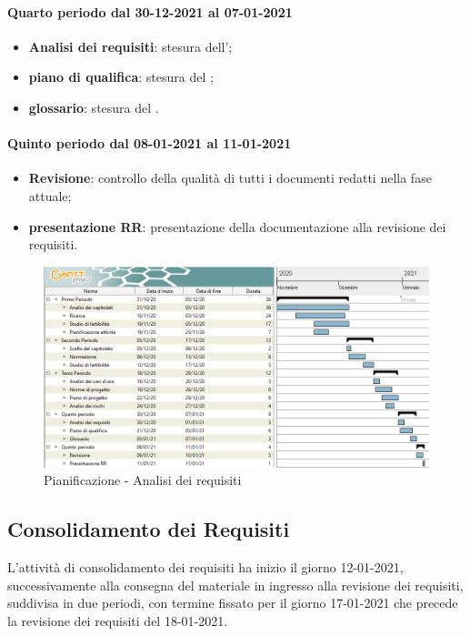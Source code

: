 \paragraph{Quarto periodo dal 30-12-2021 al 07-01-2021} 
\begin{itemize} 
	\item \textbf{Analisi dei requisiti}: stesura dell’; 
	\item \textbf{piano di qualifica}: stesura del ; 
	\item \textbf{glossario}: stesura del . 
\end{itemize} 

\paragraph{Quinto periodo dal 08-01-2021 al 11-01-2021} 
\begin{itemize} 
	\item \textbf{Revisione}: controllo della qualità di tutti i documenti redatti nella fase attuale; 
	\item \textbf{presentazione RR}: presentazione della documentazione alla revisione dei requisiti. 
\end{itemize} 


\newpage 

\begin{landscape} 
	\begin{figure}[h!] 
		\includegraphics[width=24cm]{images/1_Analisi_dei_requisiti.png} 
		\caption{Pianificazione - Analisi dei requisiti} 
	\end{figure} 
\end{landscape} 

\newpage %

\subsection{Consolidamento dei Requisiti} 
L'attività di consolidamento dei requisiti ha inizio il giorno 12-01-2021, successivamente alla consegna del materiale in ingresso alla revisione dei requisiti, suddivisa in due periodi, con termine fissato 
per il giorno 17-01-2021 che precede la revisione dei requisiti del 18-01-2021. 

